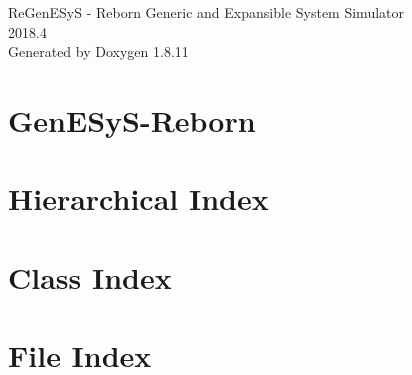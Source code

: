 \documentclass[twoside]{book}
\newcommand{\+}{\discretionary{\mbox{\scriptsize$\hookleftarrow$}}{}{}}
\newcommand{\clearemptydoublepage}{%
  \newpage{\pagestyle{empty}\cleardoublepage}%
}
\begin{document}
\hypersetup{pageanchor=false,
             bookmarksnumbered=true,
             pdfencoding=unicode
            }
\begin{titlepage}
\vspace*{7cm}
\begin{center}%
{\Large Re\+Gen\+E\+SyS -\/ Reborn Generic and Expansible System Simulator \\[1ex]\large 2018.\+4 }\\
\vspace*{1cm}
{\large Generated by Doxygen 1.8.11}\\
\end{center}
\end{titlepage}
\clearemptydoublepage
\tableofcontents
\clearemptydoublepage
{}
\hypersetup{pageanchor=true}

\chapter{Gen\+E\+Sy\+S-\/\+Reborn}
\label{md_README}
\hypertarget{md_README}{}

\chapter{Hierarchical Index}

\chapter{Class Index}

\chapter{File Index}

\end{document}
